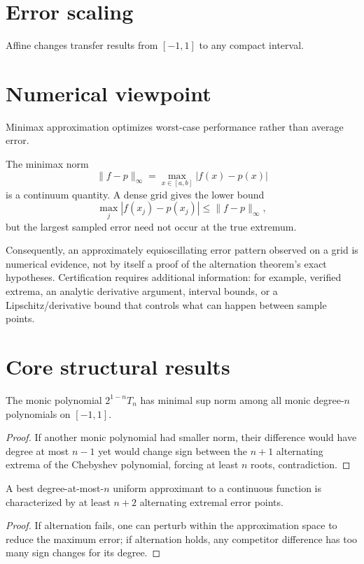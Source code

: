 \section{Error scaling}
Affine changes transfer results from $[-1,1]$ to any compact interval.

\section{Numerical viewpoint}
Minimax approximation optimizes worst-case performance rather than average error.

\begin{remark}
The minimax norm
\[
\|f-p\|_{\infty}
=
\max_{x\in[a,b]}|f(x)-p(x)|
\]
is a continuum quantity.  A dense grid gives the lower bound
\[
\max_j |f(x_j)-p(x_j)|
\le
\|f-p\|_{\infty},
\]
but the largest sampled error need not occur at the true extremum.

Consequently, an approximately equioscillating error pattern observed on a
grid is numerical evidence, not by itself a proof of the alternation theorem's
exact hypotheses.  Certification requires additional information: for
example, verified extrema, an analytic derivative argument, interval bounds,
or a Lipschitz/derivative bound that controls what can happen between sample
points.
\end{remark}

\section{Core structural results}

\begin{theorem}\label{thm:ii22-01}
The monic polynomial $2^{1-n}T_n$ has minimal sup norm among all monic degree-$n$ polynomials on $[-1,1]$.
\begin{proof}
If another monic polynomial had smaller norm, their difference would have degree at most $n-1$ yet would change sign between the $n+1$ alternating extrema of the Chebyshev polynomial, forcing at least $n$ roots, contradiction.
\end{proof}
\end{theorem}

\begin{theorem}\label{thm:ii22-02}
A best degree-at-most-$n$ uniform approximant to a continuous function is characterized by at least $n+2$ alternating extremal error points.
\begin{proof}
If alternation fails, one can perturb within the approximation space to reduce the maximum error; if alternation holds, any competitor difference has too many sign changes for its degree.
\end{proof}
\end{theorem}

